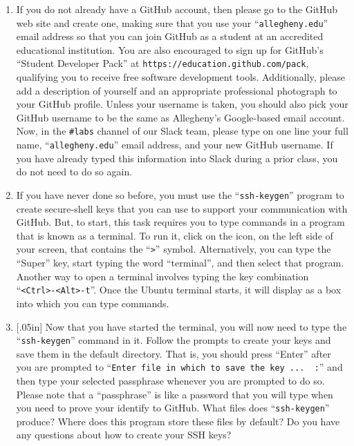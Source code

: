 \documentclass[11pt]{article}
\newcommand{\command}[1]{``\lstinline{#1}''}
\newcommand{\url}[1]{\lstinline{#1}}
\newcommand{\channel}[1]{\lstinline{#1}}
\newcommand{\think}[1]{\null\hfill\LARGE{\faCogs{}}\newline\scriptsize{\em{#1}}}
\begin{document}
\begin{enumerate}

  \item If you do not already have a GitHub account, then please go to the
    GitHub web site and create one, making sure that you use your
    \command{allegheny.edu} email address so that you can join GitHub as a
    student at an accredited educational institution. You are also encouraged
    to sign up for GitHub's ``Student Developer Pack'' at
    \url{https://education.github.com/pack}, qualifying you to receive free
    software development tools. Additionally, please add a description of
    yourself and an appropriate professional photograph to your GitHub profile.
    Unless your username is taken, you should also pick your GitHub username to
    be the same as Allegheny's Google-based email account. Now, in the
    \channel{#labs} channel of our Slack team, please type on one line your
    full name, \command{allegheny.edu} email address, and your new GitHub
    username. If you have already typed this information into Slack during a
    prior class, you do not need to do so again.

  \item If you have never done so before, you must use the \command{ssh-keygen}
    program to create secure-shell keys that you can use to support your
    communication with GitHub. But, to start, this task requires you to type
    commands in a program that is known as a terminal. To run it, click on the
    icon, on the left side of your screen, that contains the \command{>}
    symbol. Alternatively, you can type the ``Super'' key, start typing the
    word ``terminal'', and then select that program. Another way to open a
    terminal involves typing the key combination \command{<Ctrl>-<Alt>-t}. Once
    the Ubuntu terminal starts, it will display as a box into which you can
    type commands.

  \item \marginnote{\think{Understand SSH keys}}[.05in] Now that you have
    started the terminal, you will now need to type the \command{ssh-keygen}
    command in it. Follow the prompts to create your keys and save them in the
    default directory. That is, you should press ``Enter'' after you are
    prompted to \command{Enter file in which to save the key ...  :} and then
    type your selected passphrase whenever you are prompted to do so. Please
    note that a ``passphrase'' is like a password that you will type when you
    need to prove your identify to GitHub. What files does \command{ssh-keygen}
    produce? Where does this program store these files by default? Do you have
    any questions about how to create your SSH keys?


\end{enumerate}
\end{document}

